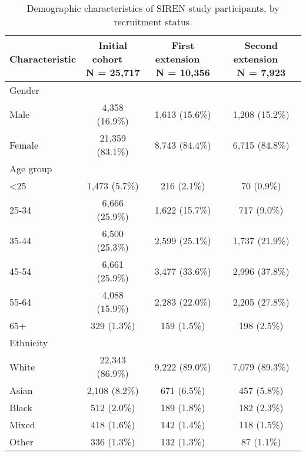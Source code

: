 
\begin{longtable}[t]{>{\raggedright\arraybackslash}p{6cm}ccc}
\caption{\label{tab:siren_demographics}Demographic characteristics of SIREN study participants, by recruitment status.}\\
\toprule
\textbf{Characteristic} & \makecell[c]{\textbf{Initial cohort}\ \ \\N = 25,717} & \makecell[c]{\textbf{First extension}\ \ \\N = 10,356} & \makecell[c]{\textbf{Second extension}\ \ \\N = 7,923}\\
\midrule
Gender &  &  & \\
\hspace{1em}Male & 4,358 (16.9\%) & 1,613 (15.6\%) & 1,208 (15.2\%)\\
\hspace{1em}Female & 21,359 (83.1\%) & 8,743 (84.4\%) & 6,715 (84.8\%)\\
Age group &  &  & \\
\hspace{1em}<25 & 1,473 (5.7\%) & 216 (2.1\%) & 70 (0.9\%)\\
\hspace{1em}25-34 & 6,666 (25.9\%) & 1,622 (15.7\%) & 717 (9.0\%)\\
\hspace{1em}35-44 & 6,500 (25.3\%) & 2,599 (25.1\%) & 1,737 (21.9\%)\\
\hspace{1em}45-54 & 6,661 (25.9\%) & 3,477 (33.6\%) & 2,996 (37.8\%)\\
\hspace{1em}55-64 & 4,088 (15.9\%) & 2,283 (22.0\%) & 2,205 (27.8\%)\\
\hspace{1em}65+ & 329 (1.3\%) & 159 (1.5\%) & 198 (2.5\%)\\
Ethnicity &  &  & \\
\hspace{1em}White & 22,343 (86.9\%) & 9,222 (89.0\%) & 7,079 (89.3\%)\\
\hspace{1em}Asian & 2,108 (8.2\%) & 671 (6.5\%) & 457 (5.8\%)\\
\hspace{1em}Black & 512 (2.0\%) & 189 (1.8\%) & 182 (2.3\%)\\
\hspace{1em}Mixed & 418 (1.6\%) & 142 (1.4\%) & 118 (1.5\%)\\
\hspace{1em}Other & 336 (1.3\%) & 132 (1.3\%) & 87 (1.1\%)\\

\end{longtable}

